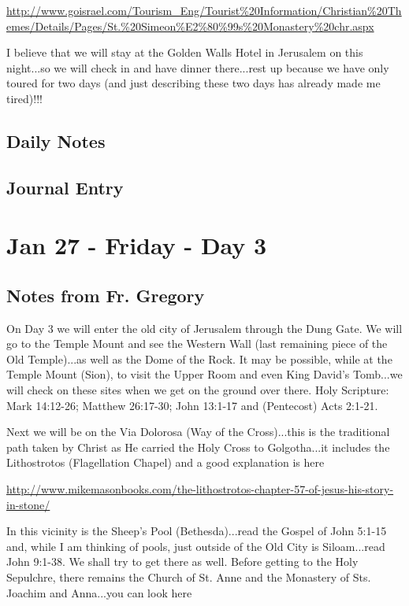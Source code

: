 \documentclass[letterpaper]{report}
\begin{document}
\url{http://www.goisrael.com/Tourism_Eng/Tourist%20Information/Christian%20Themes/Details/Pages/St.%20Simeon%E2%80%99s%20Monastery%20chr.aspx}

I believe that we will stay at the Golden Walls Hotel in Jerusalem on this night...so we will check in and have dinner there...rest up because we have only toured for two days (and just describing these two days has already made me tired)!!!

\subsection{Daily Notes}

\clearpage
\subsection{Journal Entry}

\clearpage
\section{Jan 27 - Friday - Day 3}

\subsection{Notes from Fr. Gregory}
On Day 3 we will enter the old city of Jerusalem through the Dung Gate. We will go to the Temple Mount and see the Western Wall (last remaining piece of the Old Temple)...as well as the Dome of the Rock. It may be possible, while at the Temple Mount (Sion), to visit the Upper Room and even King David's Tomb...we will check on these sites when we get on the ground over there. Holy Scripture: Mark 14:12-26; Matthew 26:17-30; John 13:1-17 and (Pentecost) Acts 2:1-21.

Next we will be on the Via Dolorosa (Way of the Cross)...this is the traditional path taken by Christ as He carried the Holy Cross to Golgotha...it includes the Lithostrotos (Flagellation Chapel) and a good explanation is here

\url{http://www.mikemasonbooks.com/the-lithostrotos-chapter-57-of-jesus-his-story-in-stone/}

In this vicinity is the Sheep's Pool (Bethesda)...read the Gospel of John 5:1-15 and, while I am thinking of pools, just outside of the Old City is Siloam...read John 9:1-38. We shall try to get there as well. Before getting to the Holy Sepulchre, there remains the Church of St. Anne and the Monastery of Sts. Joachim and Anna...you can look here
\end{document}
